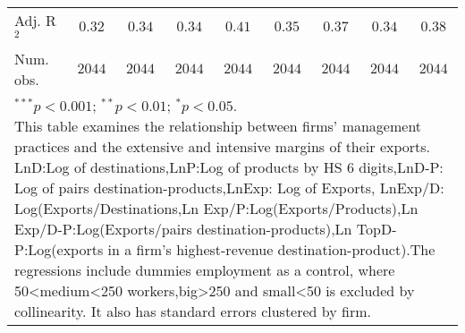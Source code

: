 \documentclass{article}
\begin{document}
\begin{table}
\begin{center}
\begin{small}
\begin{tabular}{l c c c c c c c c}
Adj. R$^2$   & $0.32$       & $0.34$       & $0.34$       & $0.41$       & $0.35$       & $0.37$       & $0.34$       & $0.38$       \\
Num. obs.    & $2044$       & $2044$       & $2044$       & $2044$       & $2044$       & $2044$       & $2044$       & $2044$       \\
\hline
\multicolumn{9}{l}{\tiny{\parbox{1\linewidth}{\vspace{3pt}$^{***}p<0.001$; $^{**}p<0.01$; $^{*}p<0.05$. \\This table examines the relationship between firms' management practices and the extensive and intensive margins of their exports. LnD:Log of destinations,LnP:Log of products by HS 6 digits,LnD-P: Log of pairs destination-products,LnExp: Log of Exports, LnExp/D: Log(Exports/Destinations,Ln Exp/P:Log(Exports/Products),Ln Exp/D-P:Log(Exports/pairs destination-products),Ln TopD-P:Log(exports in a firm's highest-revenue destination-product).The regressions include dummies employment as a control, where 50<medium<250 workers,big>250 and small<50 is excluded by collinearity. It also has standard errors clustered by firm.}}}
\end{tabular}
\end{small}
\label{table:coefficients}
\end{center}
\end{table}
\end{document}

